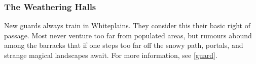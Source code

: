 \begin{multicols}{2}
{}

\subsubsection{The  Weathering Halls}

New guards always train in Whiteplains.
They consider this their basic right of passage.
Most never venture too far from populated areas, but rumours abound among the barracks that if one steps too far off the snowy path, portals, and strange magical landscapes await.
For more information, see \autoref{guard}.

\end{multicols}

\vfill\null
